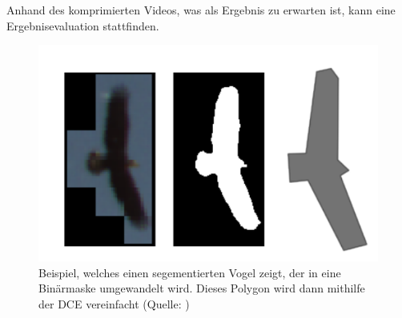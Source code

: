 \documentclass[a4paper,11pt,pdftex]{scrreport}
\begin{document}
Anhand des komprimierten Videos, was als Ergebnis zu erwarten ist, kann eine Ergebnisevaluation stattfinden.

\begin{figure}[h]
    \centering
    \includegraphics*[scale = 0.5, keepaspectratio]{images/Example_bird.png}
    \caption[Beispiel aus \citep{Dorr2017}]{Beispiel, welches einen segementierten Vogel zeigt, der in eine Binärmaske umgewandelt wird. Dieses Polygon wird dann mithilfe der DCE vereinfacht (Quelle: \citep{Dorr2017})}
    \label{Bsp_Dorr}
\end{figure}


    
    




\end{document}
